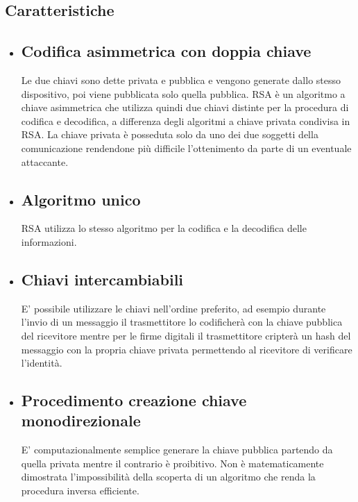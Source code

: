 \begin{itemize}
\section{Caratteristiche}
\begin{itemize}
\item \subsection{Codifica asimmetrica con doppia chiave} Le due chiavi sono dette privata e pubblica e vengono generate dallo stesso dispositivo, poi viene pubblicata solo quella pubblica. RSA è un algoritmo a chiave asimmetrica che utilizza quindi due chiavi distinte per la procedura di codifica e decodifica, a differenza degli algoritmi a chiave privata condivisa in RSA. La chiave privata è posseduta solo da uno dei due soggetti della comunicazione rendendone più difficile l'ottenimento da parte di un eventuale attaccante.\cite{brunato}
\item \subsection{Algoritmo unico}
RSA utilizza lo stesso algoritmo per la codifica e la decodifica delle informazioni.\cite{brunato}
\item \subsection{Chiavi intercambiabili}
E' possibile utilizzare le chiavi nell'ordine preferito, ad esempio durante l'invio di un messaggio il trasmettitore lo codificherà con la chiave pubblica del ricevitore mentre per le firme digitali il trasmettitore cripterà un hash del messaggio con la propria chiave privata permettendo al ricevitore di verificare l'identità.\cite{brunato}
\item \subsection{Procedimento creazione chiave monodirezionale} E' computazionalmente semplice generare la chiave pubblica partendo da quella privata mentre il contrario è proibitivo. Non è matematicamente dimostrata l'impossibilità della scoperta di un algoritmo che renda la procedura inversa efficiente.\cite{brunato}
\end{itemize}


\end{itemize}
